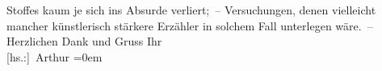 \begin{ledgroupsized}[t]{13cm}
                    Stoffes kaum je sich ins Absurde verliert; – Versuchungen, denen vielleicht
                    mancher künstlerisch stärkere Erzähler in solchem Fall unterlegen wäre. –
                    Herzlichen Dank und Gruss\pend
           \pstart
           Ihr{\\[\baselineskip]}\spacefill\mbox{{[}hs.:{]} Arthur}\pend
           \leftskip=0em{}\endnumbering{}\end{ledgroupsized}  \newcommand{\dateiname}{L02238}\newcommand{\titel}{Arthur Schnitzler an Hugo von Hofmannsthal, 22. 8. 1916}\newcommand{\editorInnen}{Martin Anton Müller und Gerd-Hermann Susen}
      